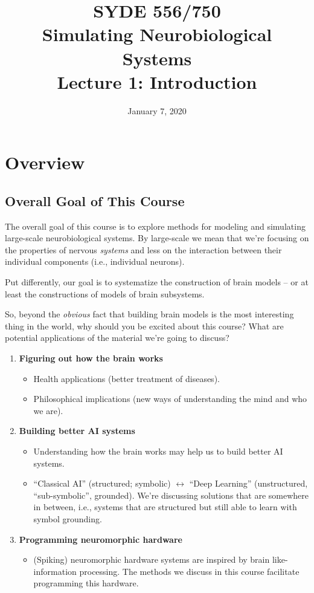 \documentclass[10pt,letterpaper,oneside]{article}
\date{January 7, 2020}
\title{SYDE 556/750 \\ Simulating Neurobiological Systems \\ Lecture 1: Introduction}
\begin{document}

\section{Overview}


\subsection{Overall Goal of This Course}

The overall goal of this course is to explore methods for modeling and simulating large-scale neurobiological systems. By large-scale we mean that we're focusing on the properties of nervous \emph{systems} and less on the interaction between their individual components (i.e., individual neurons).

Put differently, our goal is to systematize the construction of brain models -- or at least the constructions of models of brain subsystems.

So, beyond the \emph{obvious} fact that building brain models is the most interesting thing in the world, why should you be excited about this course? What are potential applications of the material we're going to discuss?
\begin{enumerate}[1.]
	\item \textbf{Figuring out how the brain works}
	\begin{itemize}
		\item Health applications (better treatment of diseases).
		\item Philosophical implications (new ways of understanding the mind and who we are).
	\end{itemize}
	\item \textbf{Building better AI systems}
	\begin{itemize}
		\item Understanding how the brain works may help us to build better AI systems.
		\item \enquote{Classical AI} (structured; symbolic) $\leftrightarrow$ \enquote{Deep Learning} (unstructured, \enquote{sub-symbolic}, grounded). We're discussing solutions that are somewhere in between, i.e., systems that are structured but still able to learn with symbol grounding.
	\end{itemize}
	\item \textbf{Programming neuromorphic hardware}
	\begin{itemize}
		\item (Spiking) neuromorphic hardware systems are inspired by brain like-information processing. The methods we discuss in this course facilitate programming this hardware.
	\end{itemize}
\end{enumerate}
\end{document}
